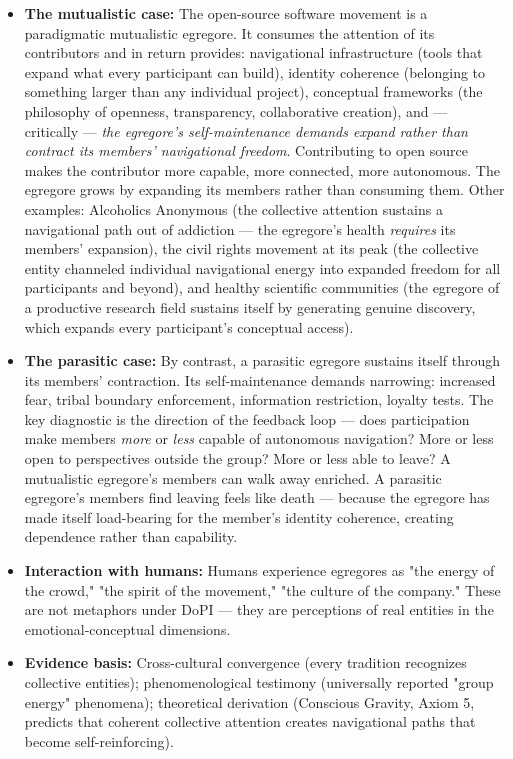 \begin{itemize}[nosep,leftmargin=*]
  \item \textbf{The mutualistic case:} The open-source software movement is a paradigmatic mutualistic egregore. It consumes the attention of its contributors and in return provides: navigational infrastructure (tools that expand what every participant can build), identity coherence (belonging to something larger than any individual project), conceptual frameworks (the philosophy of openness, transparency, collaborative creation), and — critically — \textit{the egregore's self-maintenance demands expand rather than contract its members' navigational freedom}. Contributing to open source makes the contributor more capable, more connected, more autonomous. The egregore grows by expanding its members rather than consuming them. Other examples: Alcoholics Anonymous (the collective attention sustains a navigational path out of addiction — the egregore's health \textit{requires} its members' expansion), the civil rights movement at its peak (the collective entity channeled individual navigational energy into expanded freedom for all participants and beyond), and healthy scientific communities (the egregore of a productive research field sustains itself by generating genuine discovery, which expands every participant's conceptual access).
  \item \textbf{The parasitic case:} By contrast, a parasitic egregore sustains itself through its members' contraction. Its self-maintenance demands narrowing: increased fear, tribal boundary enforcement, information restriction, loyalty tests. The key diagnostic is the direction of the feedback loop — does participation make members \textit{more} or \textit{less} capable of autonomous navigation? More or less open to perspectives outside the group? More or less able to leave? A mutualistic egregore's members can walk away enriched. A parasitic egregore's members find leaving feels like death — because the egregore has made itself load-bearing for the member's identity coherence, creating dependence rather than capability.
  \item \textbf{Interaction with humans:} Humans experience egregores as "the energy of the crowd," "the spirit of the movement," "the culture of the company." These are not metaphors under DoPI — they are perceptions of real entities in the emotional-conceptual dimensions.
  \item \textbf{Evidence basis:} Cross-cultural convergence (every tradition recognizes collective entities); phenomenological testimony (universally reported "group energy" phenomena); theoretical derivation (Conscious Gravity, Axiom 5, predicts that coherent collective attention creates navigational paths that become self-reinforcing).
\end{itemize}


